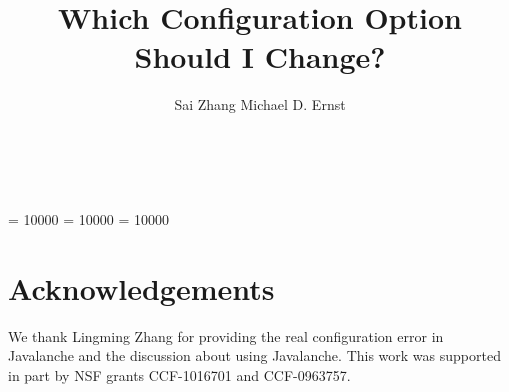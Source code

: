 \documentclass{sig-alternate-issta}
\begin{document}
\clubpenalty = 10000
\widowpenalty = 10000
\displaywidowpenalty = 10000

\title{Which Configuration Option Should I Change?}

\author{
\alignauthor Sai Zhang \quad Michael D. Ernst\\
       \\
       \\
}


\maketitle
\thispagestyle{empty}
\pagestyle{empty}



















\section{Acknowledgements}

We thank Lingming Zhang for providing the real configuration error in Javalanche and the discussion about using Javalanche. This
work was supported in part by NSF grants
CCF-1016701 and CCF-0963757.


%

\end{document}
